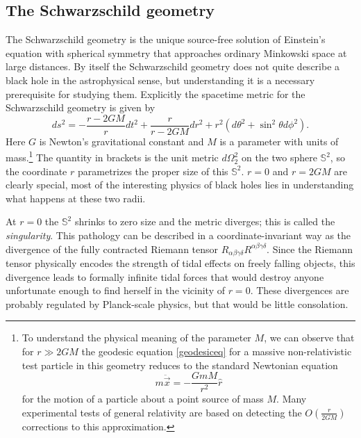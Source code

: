 \documentclass[12pt]{article}
\newcommand{\be}{\begin{equation}}
\newcommand{\ee}{\end{equation}}
\begin{document}
\subsection{The Schwarzschild geometry}\label{schgsec}
The Schwarzschild geometry is the unique source-free solution of Einstein's equation with spherical symmetry that approaches ordinary Minkowski space at large distances.  By itself the Schwarzschild geometry does not quite describe a black hole in the astrophysical sense, but understanding it is a necessary prerequisite for studying them.  Explicitly the spacetime metric for the Schwarzschild geometry is given by
\be\label{schmet}
ds^2=-\frac{r-2GM}{r}dt^2+\frac{r}{r-2GM} dr^2+r^2 (d\theta^2+\sin^2\theta d\phi^2).
\ee
Here $G$ is Newton's gravitational constant and $M$ is a parameter with units of mass.\footnote{To understand the physical meaning of the parameter $M$, we can observe that for $r\gg 2GM$ the geodesic equation \eqref{geodesiceq} for a massive non-relativistic test particle in this geometry reduces to the standard Newtonian equation
\be
m\ddot{\vec{x}}=-\frac{Gm M}{r^2}\hat{r}
\ee
for the motion of a particle about a point source of mass $M$.  Many experimental tests of general relativity are based on detecting the $O\left(\frac{r}{2GM}\right)$ corrections to this approximation.}
The quantity in brackets is the unit metric $d\Omega_2^2$ on the two sphere $\mathbb{S}^2$, so the coordinate $r$ parametrizes the proper size of this $\mathbb{S}^2$.  $r=0$ and $r=2GM$ are clearly special, most of the interesting physics of black holes lies in understanding what happens at these two radii.  

At $r=0$ the $\mathbb{S}^2$ shrinks to zero size and the metric diverges; this is called the \textit{singularity}.  This pathology can be described in a coordinate-invariant way as the divergence of the fully contracted Riemann tensor $R_{\alpha\beta\gamma \delta}R^{\alpha\beta\gamma\delta}$.  Since the Riemann tensor physically encodes the strength of tidal effects on freely falling objects, this divergence leads to formally infinite tidal forces that would destroy anyone unfortunate enough to find herself in the vicinity of $r=0$.  These divergences are probably regulated by Planck-scale physics, but that would be little consolation.   
\end{document}
